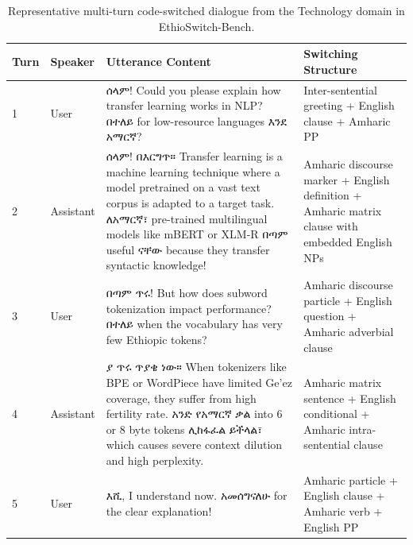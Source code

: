 \documentclass[11pt,a4paper]{article}
\begin{document}
\begin{table}[htbp]
\centering
\small
\caption{Representative multi-turn code-switched dialogue from the Technology domain in EthioSwitch-Bench.}
\label{tab:sample_dialogue}
\begin{tabularx}{\textwidth}{lp{1.5cm}Xp{4.2cm}}
\toprule
\textbf{Turn} & \textbf{Speaker} & \textbf{Utterance Content} & \textbf{Switching Structure} \\
\midrule
1 & User & ሰላም! Could you please explain how transfer learning works in NLP? በተለይ for low-resource languages እንደ አማርኛ? & Inter-sentential greeting + English clause + Amharic PP \\
2 & Assistant & ሰላም! በእርግጥ። Transfer learning is a machine learning technique where a model pretrained on a vast text corpus is adapted to a target task. ለአማርኛ፣ pre-trained multilingual models like mBERT or XLM-R በጣም useful ናቸው because they transfer syntactic knowledge! & Amharic discourse marker + English definition + Amharic matrix clause with embedded English NPs \\
3 & User & በጣም ጥሩ! But how does subword tokenization impact performance? በተለይ when the vocabulary has very few Ethiopic tokens? & Amharic discourse particle + English question + Amharic adverbial clause \\
4 & Assistant & ያ ጥሩ ጥያቄ ነው። When tokenizers like BPE or WordPiece have limited Ge'ez coverage, they suffer from high fertility rate. አንድ የአማርኛ ቃል into 6 or 8 byte tokens ሊከፋፈል ይችላል፣ which causes severe context dilution and high perplexity. & Amharic matrix sentence + English conditional + Amharic intra-sentential clause \\
5 & User & እሺ, I understand now. አመሰግናለሁ for the clear explanation! & Amharic particle + English clause + Amharic verb + English PP \\
\bottomrule
\end{tabularx}
\end{table}
\end{document}
